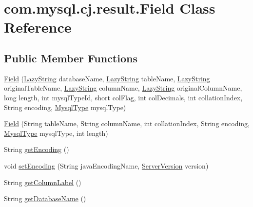 \hypertarget{classcom_1_1mysql_1_1cj_1_1result_1_1_field}{}\section{com.\+mysql.\+cj.\+result.\+Field Class Reference}
\label{classcom_1_1mysql_1_1cj_1_1result_1_1_field}
\subsection*{Public Member Functions}
\begin{DoxyCompactItemize}
\item 
\mbox{\hyperlink{classcom_1_1mysql_1_1cj_1_1result_1_1_field_ab848d3e583a486ff56d0892152bcf8d0}{Field}} (\mbox{\hyperlink{classcom_1_1mysql_1_1cj_1_1util_1_1_lazy_string}{Lazy\+String}} database\+Name, \mbox{\hyperlink{classcom_1_1mysql_1_1cj_1_1util_1_1_lazy_string}{Lazy\+String}} table\+Name, \mbox{\hyperlink{classcom_1_1mysql_1_1cj_1_1util_1_1_lazy_string}{Lazy\+String}} original\+Table\+Name, \mbox{\hyperlink{classcom_1_1mysql_1_1cj_1_1util_1_1_lazy_string}{Lazy\+String}} column\+Name, \mbox{\hyperlink{classcom_1_1mysql_1_1cj_1_1util_1_1_lazy_string}{Lazy\+String}} original\+Column\+Name, long length, int mysql\+Type\+Id, short col\+Flag, int col\+Decimals, int collation\+Index, String encoding, \mbox{\hyperlink{enumcom_1_1mysql_1_1cj_1_1_mysql_type}{Mysql\+Type}} mysql\+Type)
\item 
\mbox{\hyperlink{classcom_1_1mysql_1_1cj_1_1result_1_1_field_a33e583bba81e01de1067f68e0a0c0e4a}{Field}} (String table\+Name, String column\+Name, int collation\+Index, String encoding, \mbox{\hyperlink{enumcom_1_1mysql_1_1cj_1_1_mysql_type}{Mysql\+Type}} mysql\+Type, int length)
\item 
String \mbox{\hyperlink{classcom_1_1mysql_1_1cj_1_1result_1_1_field_a35ed1500146aaf3c66c9b8912318a210}{get\+Encoding}} ()
\item 
void \mbox{\hyperlink{classcom_1_1mysql_1_1cj_1_1result_1_1_field_a15ab864bf941a4eacc993a63378f9891}{set\+Encoding}} (String java\+Encoding\+Name, \mbox{\hyperlink{classcom_1_1mysql_1_1cj_1_1_server_version}{Server\+Version}} version)
\item 
String \mbox{\hyperlink{classcom_1_1mysql_1_1cj_1_1result_1_1_field_a8cb0ae5fe9a52cb5cd1c6f956127194f}{get\+Column\+Label}} ()
\item 
String \mbox{\hyperlink{classcom_1_1mysql_1_1cj_1_1result_1_1_field_a0eedb891db60ef00c9694e28814938a7}{get\+Database\+Name}} ()

\end{DoxyCompactItemize}
